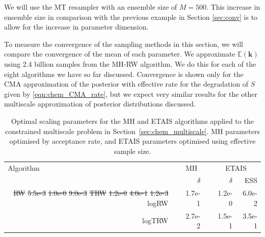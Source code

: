\documentclass[final]{siamltex}
\providecommand{\DIFdel}[1]{{\protect\color{red}\sout{#1}}}                      %
\providecommand{\DIFdelbegin}{} %
\providecommand{\DIFdelend}{} %
\providecommand{\DIFdelFL}[1]{\DIFdel{#1}} %
\providecommand{\DIFdelbeginFL}{} %
\providecommand{\DIFdelendFL}{} %
\newcommand{\DIFscaledelfig}{0.5}
\newlength{\DIFdelgraphicswidth} %
\newlength{\DIFdelgraphicsheight} %
\newcommand{\DIFdelincludegraphics}[2][]{%
\sbox{\DIFdelgraphicsbox}{\DIFOincludegraphics[#1]{#2}}%
\settoboxwidth{\DIFdelgraphicswidth}{\DIFdelgraphicsbox} %
\settoboxtotalheight{\DIFdelgraphicsheight}{\DIFdelgraphicsbox} %
\scalebox{\DIFscaledelfig}{%
\parbox[b]{\DIFdelgraphicswidth}{\usebox{\DIFdelgraphicsbox}\\[-\baselineskip] \rule{\DIFdelgraphicswidth}{0em}}\llap{\resizebox{\DIFdelgraphicswidth}{\DIFdelgraphicsheight}{%
\setlength{\unitlength}{\DIFdelgraphicswidth}%
\begin{picture}(1,1)%
\thicklines\linethickness{2pt} %
{\color[rgb]{1,0,0}\put(0,0){\framebox(1,1){}}}%
{\color[rgb]{1,0,0}\put(0,0){\line( 1,1){1}}}%
{\color[rgb]{1,0,0}\put(0,1){\line(1,-1){1}}}%
\end{picture}%
}\hspace*{3pt}}} %
} %
\DeclareRobustCommand{\DIFdelbegin}{\DIFOdelbegin \let\includegraphics\DIFdelincludegraphics} %
\DeclareRobustCommand{\DIFdelend}{\DIFOaddend \let\includegraphics\DIFOincludegraphics} %
\DeclareRobustCommand{\DIFdelbeginFL}{\DIFOdelbeginFL \let\includegraphics\DIFdelincludegraphics} %
\DeclareRobustCommand{\DIFdelendFL}{\DIFOaddendFL \let\includegraphics\DIFOincludegraphics} %
\begin{document}
We will use the MT\cite{russ2017parallel} resampler with an ensemble size of
$M=500$. This increase in ensemble size in comparison with the previous
example in Section \ref{sec:conv} is to allow for the increase in parameter dimension.

To measure the convergence of the sampling methods in this section, we
will compare the convergence of the mean of each parameter. We
approximate $\mathbb{E}(\mathbf{k})$ using 2.4 billion samples from
the MH-RW algorithm. We do this for each of the eight algorithms we
have so far discussed. Convergence is shown only for the CMA
approximation of the posterior \DIFdelbegin %
\DIFdelend with effective rate for
the degradation of $S$ given by \eqref{eqn:chem_CMA_rate}, but we
expect very similar results for the other multiscale approximation of
posterior distributions
discussed.

\begin{table}[!h]
\centering
\begin{tabular}{rrrrrr}
\toprule
	\multicolumn{1}{l}{Algorithm} & \multicolumn{3}{c}{MH} & \multicolumn{2}{c}{ETAIS} \\ \cmidrule(lr){2-4} \cmidrule(lr){5-6}
	& & $\delta$ & & $\delta$ & ESS \\ \midrule
	\DIFdelbeginFL \DIFdelFL{RW }%
\DIFdelFL{5.5e-3 }%
\DIFdelFL{1.0e-0 }%
\DIFdelFL{9.0e-3 }%
\DIFdelFL{TRW }%
\DIFdelFL{1.2e-0 }%
\DIFdelFL{4.0e-1 }%
\DIFdelFL{1.2e-3 }%
\DIFdelendFL %
	logRW & & 1.7e-1 & & 1.2e-0 & 6.0e-2 \\
	logTRW & & 2.7e-2 & & 1.5e-1 & 3.5e-1 \\
\bottomrule
\end{tabular}
\caption{Optimal scaling parameters for the MH and ETAIS algorithms applied to the constrained multiscale problem in Section~\ref{sec:chem_multiscale}. MH parameters optimised by acceptance rate, and ETAIS parameters optimised using effective sample size.}
\label{tab:chem_multiscale_scaling}
\end{table}
\end{document}
